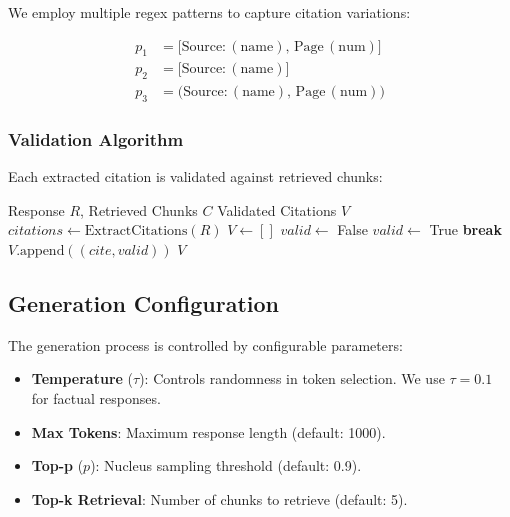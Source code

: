 \documentclass[runningheads]{llncs}
\begin{document}
We employ multiple regex patterns to capture citation variations:

\begin{align}
p_1 &= \text{[Source:}\,(\text{name}),\,\text{Page}\,(\text{num})\text{]} \\
p_2 &= \text{[Source:}\,(\text{name})\text{]} \\
p_3 &= \text{(Source:}\,(\text{name}),\,\text{Page}\,(\text{num})\text{)}
\end{align}

\subsubsection{Validation Algorithm}

Each extracted citation is validated against retrieved chunks:

\begin{algorithm}
\caption{Citation Validation}
\begin{algorithmic}[1]
\REQUIRE Response $R$, Retrieved Chunks $C$
\ENSURE Validated Citations $V$
\STATE $citations \leftarrow \text{ExtractCitations}(R)$
\STATE $V \leftarrow []$
    \STATE $valid \leftarrow$ False
            \STATE $valid \leftarrow$ True
            \STATE \textbf{break}
        \ENDIF
    \ENDFOR
    \STATE $V.\text{append}((cite, valid))$
\ENDFOR
\RETURN $V$
\end{algorithmic}
\end{algorithm}

\subsection{Generation Configuration}

The generation process is controlled by configurable parameters:

\begin{itemize}
    \item \textbf{Temperature} ($\tau$): Controls randomness in token selection. We use $\tau = 0.1$ for factual responses.
    \item \textbf{Max Tokens}: Maximum response length (default: 1000).
    \item \textbf{Top-p} ($p$): Nucleus sampling threshold (default: 0.9).
    \item \textbf{Top-k Retrieval}: Number of chunks to retrieve (default: 5).
\end{itemize}
\end{document}
